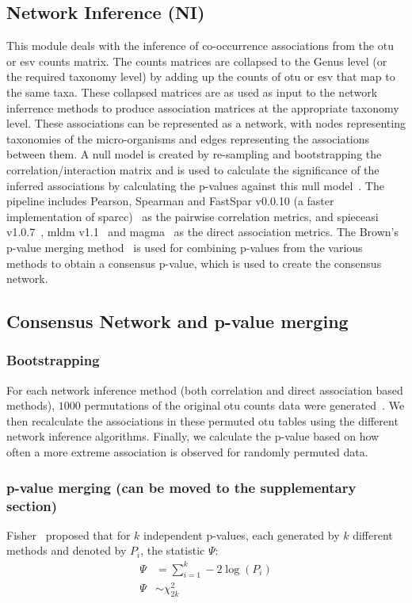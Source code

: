   \subsection*{Network Inference (NI)}
  \vspace{-5mm}
  This module deals with the inference of co-occurrence associations from the \ac{otu} or \ac{esv} counts matrix.
  The counts matrices are collapsed to the Genus level (or the required taxonomy level) by adding up the counts of \ac{otu} or \ac{esv} that map to the same taxa.
  These collapsed matrices are as used as input to the network inferrence methods to produce association matrices at the appropriate taxonomy level.
  These associations can be represented as a network, with nodes representing taxonomies of the micro-organisms and edges representing the associations between them.
  A null model is created by re-sampling and bootstrapping the correlation/interaction matrix and is used to calculate the significance of the inferred associations by calculating the p-values against this null model~\cite{Watts2018}.
  The pipeline includes Pearson, Spearman and FastSpar v0.0.10 (a faster implementation of \ac{sparcc})~\cite{Watts2018} as the pairwise correlation metrics, and \ac{spieceasi} v1.0.7~\cite{Kurtz2015}, \ac{mldm} v1.1~\cite{Yang2017} and \ac{magma}~\cite{Cougoul2019} as the direct association metrics.
  The Brown's p-value merging method~\cite{brown_400_1975} is used for combining p-values from the various methods to obtain a consensus p-value, which is used to create the consensus network.

  \subsection*{Consensus Network and p-value merging}
  \vspace{-5mm}

  \subsubsection*{Bootstrapping}
  For each network inference method (both correlation and direct association based methods), $1000$ permutations of the original \ac{otu} counts data were generated~\cite{Watts2018}.
  We then recalculate the associations in these permuted \ac{otu} tables using the different network inference algorithms.
  Finally, we calculate the p-value based on how often a more extreme association is observed for randomly permuted data.

  \subsubsection*{p-value merging (can be moved to the supplementary section)}
  Fisher~\cite{fisher_224a_1948} proposed that for $k$ independent p-values, each generated by $k$ different methods and denoted by $P_i$, the statistic $\Psi$:
  \begin{equation*}
    \begin{aligned}
        \Psi &= \sum_{i=1}^k -2 \log \left( P_i \right) \\
        \Psi &\sim \chi^2_{2k}
    \end{aligned}
  \end{equation*}

